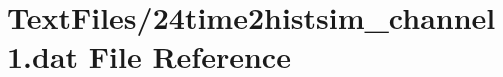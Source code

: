 \hypertarget{24time2histsim__channel1_8dat}{}\section{Text\+Files/24time2histsim\+\_\+channel1.dat File Reference}
\label{24time2histsim__channel1_8dat}
